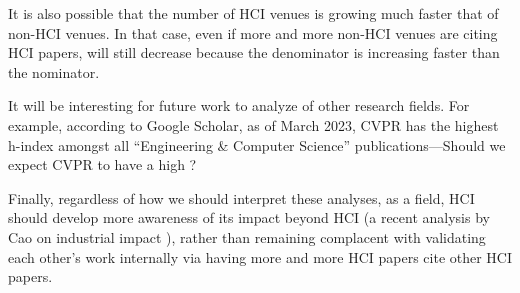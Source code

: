 It is also possible that the number of HCI venues is growing much faster that of non-HCI venues.
In that case, even if more and more non-HCI venues are citing HCI papers, \xin will still decrease because the denominator is increasing faster than the nominator.

It will be interesting for future work to analyze \xin of other research fields. 
For example, according to Google Scholar, as of March 2023, CVPR has the highest h-index amongst all ``Engineering \& Computer Science'' publications---Should we expect CVPR to have a high \xin?

Finally, regardless of how we should interpret these analyses, as a field, HCI should develop more awareness of its impact beyond HCI (\eg a recent analysis by Cao \etal on industrial impact \cite{cao_breaking_2023}), rather than remaining complacent with validating each other's work internally via having more and more HCI papers cite other HCI papers.

